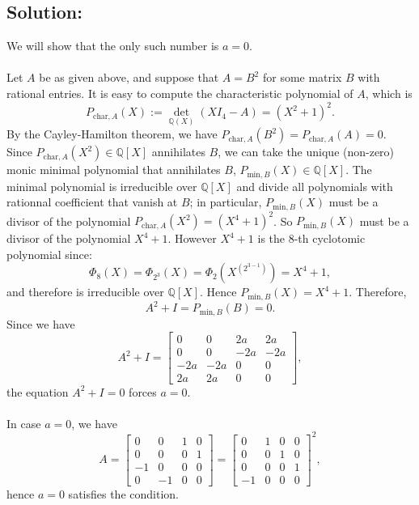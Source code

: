 \documentclass[11pt, a4paper, oneside]{article}
\newcommand{\solution}[1][]{\subsection*{#1}\hfill \par}
\theoremstyle{remark}
\theoremstyle{lemma}
\begin{document}
\solution[Solution:]
We will show that the only such number is $a = 0$.
\\\\
Let \( A \) be as given above, and suppose that \( A = B^2 \) for some matrix \( B \) with rational entries. It is easy to compute the characteristic polynomial of \( A \), which is
\[
P_{\text{char},A}(X) := {\det}_{\mathbb{Q}(X)}(XI_4-A) = \left(X^2 + 1\right)^2.
\]
By the Cayley-Hamilton theorem, we have \( P_{\text{char},A}\left(B^2\right) = P_{\text{char},A}(A) = 0 \). Since $P_{\text{char},A}\left(X^2\right)\in\mathbb{Q}[X]$ annihilates $B$, we can take the unique (non-zero) monic minimal polynomial that annihilates $B$, $P_{\text{min},B}(X)\in\mathbb{Q}[X]$. The minimal polynomial is irreducible over $\mathbb{Q}[X]$ and divide all polynomials with rationnal coefficient that vanish at \( B \); in particular, \( P_{\text{min},B}(X) \) must be a divisor of the polynomial \( P_{\text{char},A}\left(X^2\right) = \left(X^4 + 1\right)^2 \). So \( P_{\text{min},B}(X) \) must be a divisor of the polynomial $X^4 + 1$. However \( X^4 + 1 \) is the $8$-th cyclotomic polynomial since:
$$\Phi_{8}(X)=\Phi_{2^3}(X)=\Phi_{2}\left(X^{\left(2^{3-1}\right)}\right)=X^4+1,$$
and therefore is irreducible over \( \mathbb{Q}[X] \). Hence \( P_{\text{min},B}(X)= X^4+1\). Therefore,
\[
A^2 + I = P_{\text{min},B}(B) = 0.
\]
Since we have
\[
A^2 + I = \begin{bmatrix}
    0 & 0 & 2a & 2a \\
    0 & 0 & -2a & -2a \\
    -2a & -2a & 0 & 0 \\
    2a & 2a & 0 & 0
\end{bmatrix},
\]
the equation \( A^2 + I = 0 \) forces \( a = 0 \).
\\\\
In case \( a = 0 \), we have
\[
A = \begin{bmatrix}
    0 & 0 & 1 & 0 \\
    0 & 0 & 0 & 1 \\
    -1 & 0 & 0 & 0 \\
    0 & -1 & 0 & 0
\end{bmatrix} = \begin{bmatrix}
    0 & 1 & 0 & 0 \\
    0 & 0 & 1 & 0 \\
    0 & 0 & 0 & 1 \\
    -1 & 0 & 0 & 0
\end{bmatrix}^2,
\]
hence \( a = 0 \) satisfies the condition.
\end{document}
